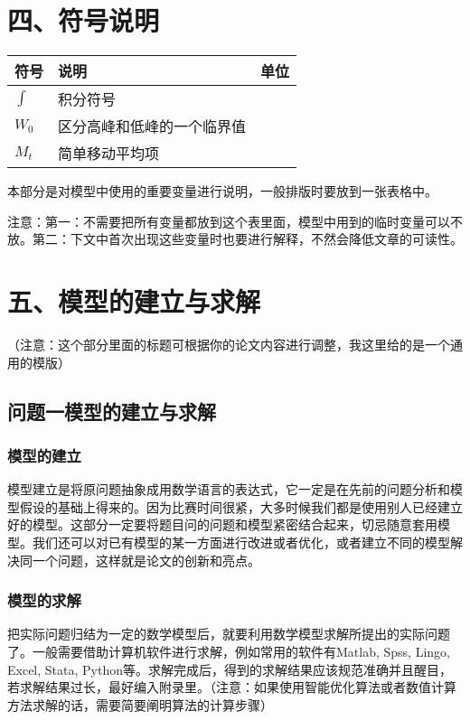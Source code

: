 \documentclass{article}
\begin{document}
\section{四、符号说明}
\begin{table}[h]%
    \centering
    \begin{tabular}{p{2.0cm}<{\centering}p{9.0cm}<{\centering}p{2.0cm}<{\centering}}
    \hline
    符号 & 说明 & 单位 \\ %
    \hline
    $\int$ & 积分符号 &  \\ %
    $W_0$ & 区分高峰和低峰的一个临界值 &  \\ %
    $M_t$ &  简单移动平均项 &  \\ %
    \hline
    \end{tabular}
\end{table}
本部分是对模型中使用的重要变量进行说明，一般排版时要放到一张表格中。

注意：第一：不需要把所有变量都放到这个表里面，模型中用到的临时变量可以不放。第二：下文中首次出现这些变量时也要进行解释，不然会降低文章的可读性。

\section{五、模型的建立与求解}

（注意：这个部分里面的标题可根据你的论文内容进行调整，我这里给的是一个通用的模版）

\subsection{问题一模型的建立与求解}
\subsubsection{模型的建立}
模型建立是将原问题抽象成用数学语言的表达式，它一定是在先前的问题分析和模型假设的基础上得来的。因为比赛时间很紧，大多时候我们都是使用别人已经建立好的模型。这部分一定要将题目问的问题和模型紧密结合起来，切忌随意套用模型。我们还可以对已有模型的某一方面进行改进或者优化，或者建立不同的模型解决同一个问题，这样就是论文的创新和亮点。
\subsubsection{模型的求解}
把实际问题归结为一定的数学模型后，就要利用数学模型求解所提出的实际问题了。一般需要借助计算机软件进行求解，例如常用的软件有Matlab, Spss, Lingo, Excel, Stata, Python等。求解完成后，得到的求解结果应该规范准确并且醒目，若求解结果过长，最好编入附录里。（注意：如果使用智能优化算法或者数值计算方法求解的话，需要简要阐明算法的计算步骤）
\end{document}
